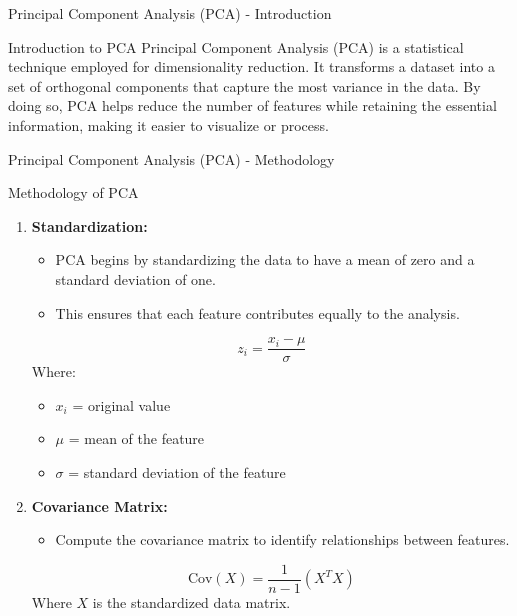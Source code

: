 \documentclass[aspectratio=169]{beamer}
\begin{document}
\begin{frame}[fragile]{Principal Component Analysis (PCA) - Introduction}
    \begin{block}{Introduction to PCA}
        Principal Component Analysis (PCA) is a statistical technique employed for dimensionality reduction. It transforms a dataset into a set of orthogonal components that capture the most variance in the data. By doing so, PCA helps reduce the number of features while retaining the essential information, making it easier to visualize or process.
    \end{block}
\end{frame}

\begin{frame}[fragile]{Principal Component Analysis (PCA) - Methodology}
    \begin{block}{Methodology of PCA}
        \begin{enumerate}
            \item \textbf{Standardization:}
            \begin{itemize}
                \item PCA begins by standardizing the data to have a mean of zero and a standard deviation of one.
                \item This ensures that each feature contributes equally to the analysis.
                \end{itemize}
                \begin{equation}
                z_i = \frac{x_i - \mu}{\sigma}
                \end{equation}
                Where: 
                \begin{itemize}
                    \item \(x_i\) = original value
                    \item \(\mu\) = mean of the feature
                    \item \(\sigma\) = standard deviation of the feature
                \end{itemize}
            
            \item \textbf{Covariance Matrix:}
            \begin{itemize}
                \item Compute the covariance matrix to identify relationships between features.
            \end{itemize}
            \begin{equation}
            \text{Cov}(X) = \frac{1}{n-1} (X^T X)
            \end{equation}
            Where \(X\) is the standardized data matrix.
        \end{enumerate}
    \end{block}
\end{frame}
\end{document}
